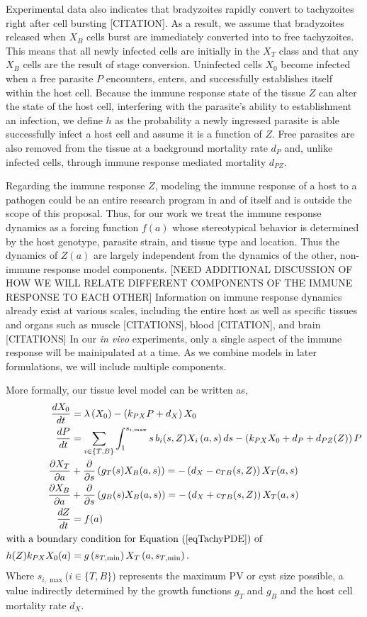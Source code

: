 \documentclass[11pt,fleqn,letterpaper]{article}
\newcommand{\invitro}{\emph{in vivo}\xspace}
\newcommand{\smint}{\ensuremath{s_{T,\min}}\xspace}
\newcommand{\smaxi}{\ensuremath{{s_{i,\max}}}\xspace}
\begin{document}
Experimental data also indicates that bradyzoites rapidly convert to tachyzoites right after cell bursting [CITATION].
As a result, we assume that bradyzoites released when $X_B$ cells burst are immediately converted into to free tachyzoites.
This means that all newly infected cells are initially in the $X_T$ class and that any $X_B$ cells are the result of stage conversion.
Uninfected cells $X_0$ become infected when a free parasite $P$ encounters, enters, and successfully establishes itself within the host cell.
Because the immune response state of the tissue $Z$ can alter the state of the host cell, interfering with the parasite's ability to establishment an infection, we define $h$ as the probability a newly ingressed parasite is able successfully infect a host cell and assume it is a function of $Z$.
Free parasites are also removed from the tissue at a background mortality rate $d_P$ and, unlike infected cells, through immune response mediated mortality $d_{PZ}$.

Regarding the immune response $Z$, modeling the immune response of a host to a pathogen could be an entire research program in and of itself and is outside the scope of this proposal.
Thus, for our work we treat the immune response dynamics as a forcing function $f(a)$ whose stereotypical behavior is determined by the host genotype, parasite strain, and tissue type and location.
Thus the dynamics of $Z(a)$ are largely independent from the dynamics of the other, non-immune response model components. 
[NEED ADDITIONAL DISCUSSION OF HOW WE WILL RELATE DIFFERENT COMPONENTS OF THE IMMUNE RESPONSE TO EACH OTHER]
Information on immune response dynamics already exist at various scales, including the entire host as well as specific tissues and organs  such as muscle [CITATIONS], blood [CITATION], and brain [CITATIONS]
In our \invitro experiments, only a single aspect of the immune response will be mainipulated at a time.
As we combine models in later formulations, we will include multiple components.

More formally, our tissue level model can be written as,
\begin{align*}
\frac{d X_0}{dt} &= \lambda\left(X_0\right) - \left(k_{PX} P + d_X\right) X_0\\
\frac{d P}{dt} &= \sum_{i \in \{T,B\}} \int_1^\smaxi s \, b_i(s, Z) X_i\left(a, s\right) ds - \left(k_{PX} X_0 + d_P + d_{PZ}(Z)\right) P\\
\frac{\partial X_T}{\partial a} &+ \frac{\partial }{\partial s} \left( g_T(s) X_B(a,s)\right) = - \left(d_X - c_{TB}(s, Z)\right) X_T(a,s) \label{eqTachyPDE}\\
\frac{\partial X_B}{\partial a} &+ \frac{\partial }{\partial s} \left( g_B(s) X_B(a,s)\right) = - \left(d_X + c_{TB}(s,Z)\right) X_T(a,s)\\
\frac{d Z}{dt} &=f(a)\\
\intertext{with a boundary condition for Equation (\ref{eqTachyPDE}) of}
h(Z) k_{PX} X_0(a) &= g\left(\smint\right) X_T\left(a, \smint\right).
\end{align*}
Where \smaxi ($i \in \{T,B\}$) represents the maximum PV or cyst size possible, a value indirectly determined by the growth functions $g_T$ and $g_B$ and the host cell mortality rate $d_X$.
\end{document}
